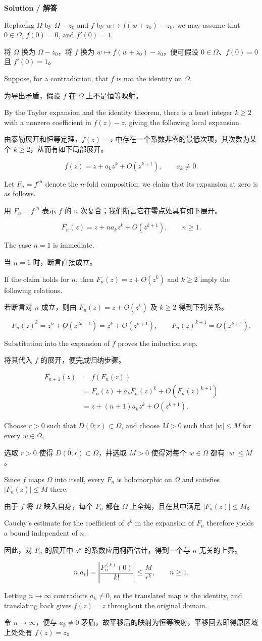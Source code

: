 \documentclass[11pt,a4paper]{ctexart}
\newcommand{\pair}[2]{\par\noindent #1\par\nopagebreak[3]\noindent #2\par}
\newcommand{\heading}[2]{\par\medskip\textbf{#1 / #2}\par\nopagebreak[4]}
\begin{document}
\heading{Solution}{解答}
\pair{Replacing $\Omega$ by $\Omega-z_0$ and $f$ by $w\mapsto f(w+z_0)-z_0$, we may assume that $0\in\Omega$, $f(0)=0$, and $f'(0)=1$.}{将 $\Omega$ 换为 $\Omega-z_0$，将 $f$ 换为 $w\mapsto f(w+z_0)-z_0$，便可假设 $0\in\Omega$、$f(0)=0$ 且 $f'(0)=1$。}
\pair{Suppose, for a contradiction, that $f$ is not the identity on $\Omega$.}{为导出矛盾，假设 $f$ 在 $\Omega$ 上不是恒等映射。}
\pair{By the Taylor expansion and the identity theorem, there is a least integer $k\ge2$ with a nonzero coefficient in $f(z)-z$, giving the following local expansion.}{由泰勒展开和恒等定理，$f(z)-z$ 中存在一个系数非零的最低次项，其次数为某个 $k\ge2$，从而有如下局部展开。}
\[
f(z)=z+a_kz^k+O(z^{k+1}),\qquad a_k\ne0.
\]
\pair{Let $F_n=f^{\circ n}$ denote the $n$-fold composition; we claim that its expansion at zero is as follows.}{用 $F_n=f^{\circ n}$ 表示 $f$ 的 $n$ 次复合；我们断言它在零点处具有如下展开。}
\[
F_n(z)=z+n a_kz^k+O(z^{k+1}),\qquad n\ge1.
\]
\pair{The case $n=1$ is immediate.}{当 $n=1$ 时，断言直接成立。}
\pair{If the claim holds for $n$, then $F_n(z)=z+O(z^k)$ and $k\ge2$ imply the following relations.}{若断言对 $n$ 成立，则由 $F_n(z)=z+O(z^k)$ 及 $k\ge2$ 得到下列关系。}
\[
F_n(z)^k=z^k+O(z^{2k-1})=z^k+O(z^{k+1}),
\qquad F_n(z)^{k+1}=O(z^{k+1}).
\]
\pair{Substitution into the expansion of $f$ proves the induction step.}{将其代入 $f$ 的展开，便完成归纳步骤。}
\begin{align*}
F_{n+1}(z)&=f(F_n(z))\\
&=F_n(z)+a_kF_n(z)^k+O(F_n(z)^{k+1})\\
&=z+(n+1)a_kz^k+O(z^{k+1}).
\end{align*}
\pair{Choose $r>0$ such that $\overline{D(0;r)}\subset\Omega$, and choose $M>0$ such that $|w|\le M$ for every $w\in\Omega$.}{选取 $r>0$ 使得 $\overline{D(0;r)}\subset\Omega$，并选取 $M>0$ 使得对每个 $w\in\Omega$ 都有 $|w|\le M$。}
\pair{Since $f$ maps $\Omega$ into itself, every $F_n$ is holomorphic on $\Omega$ and satisfies $|F_n(z)|\le M$ there.}{由于 $f$ 将 $\Omega$ 映入自身，每个 $F_n$ 都在 $\Omega$ 上全纯，且在其中满足 $|F_n(z)|\le M$。}
\pair{Cauchy's estimate for the coefficient of $z^k$ in the expansion of $F_n$ therefore yields a bound independent of $n$.}{因此，对 $F_n$ 的展开中 $z^k$ 的系数应用柯西估计，得到一个与 $n$ 无关的上界。}
\[
n|a_k|=\left|\frac{F_n^{(k)}(0)}{k!}\right|
\le\frac{M}{r^k},\qquad n\ge1.
\]
\pair{Letting $n\to\infty$ contradicts $a_k\ne0$, so the translated map is the identity, and translating back gives $f(z)=z$ throughout the original domain.}{令 $n\to\infty$，便与 $a_k\ne0$ 矛盾，故平移后的映射为恒等映射，平移回去即得原区域上处处有 $f(z)=z$。}
\end{document}
